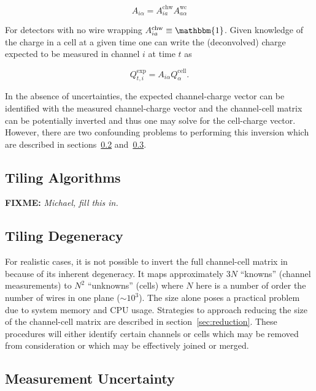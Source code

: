 \documentclass[letter]{article}
\newcommand\fixme[1]{\textbf{FIXME:} \textit{#1}\xspace}
\def\mQexp{Q^{\mathrm{exp}}_{t,i}}
\def\mAchc{A_{i\alpha}}
\def\mAchw{A^{\mathrm{chw}}_{ia}}
\def\mAwc{A^{\mathrm{wc}}_{a\alpha}}
\def\mQcell{Q^{\mathrm{cell}}_\alpha}
\begin{document}
\begin{equation}
  \label{eq:Achc}
  \mAchc = \mAchw \mAwc
\end{equation}

For detectors with no wire wrapping $\mAchw \equiv \mathbbm{1}$.
Given knowledge of the charge in a cell at a given time one can write
the (deconvolved) charge expected to be measured in channel $i$ at
time $t$ as

\begin{equation}
  \label{eq:Qexp}
  \mQexp = \mAchc \mQcell.
\end{equation}

In the absence of uncertainties, the expected channel-charge vector
can be identified with the measured channel-charge vector and the
channel-cell matrix can be potentially inverted and thus one may solve
for the cell-charge vector.
However, there are two confounding problems to performing this
inversion which are described in
sections~\ref{subsec:tilingdegeneracy} and~\ref{subsec:chargeunc}.

\subsection{Tiling Algorithms}
\label{subsec:tilingalg}

\fixme{Michael, fill this in.}

\subsection{Tiling Degeneracy}
\label{subsec:tilingdegeneracy}

For realistic cases, it is not possible to invert the full
channel-cell matrix in because of its inherent degeneracy.
It maps approximately $3N$ ``knowns'' (channel measurements) to $N^2$
``unknowns'' (cells) where $N$ here is a number of order the number of
wires in one plane ($\sim 10^3$).
The size alone poses a practical problem due to system memory and CPU
usage.
Strategies to approach reducing the size of the channel-cell matrix
are described in section~\ref{sec:reduction}.
These procedures will either identify certain channels or cells which
may be removed from consideration or which may be effectively joined
or merged.

\subsection{Measurement Uncertainty}
\label{subsec:chargeunc}
\end{document}
